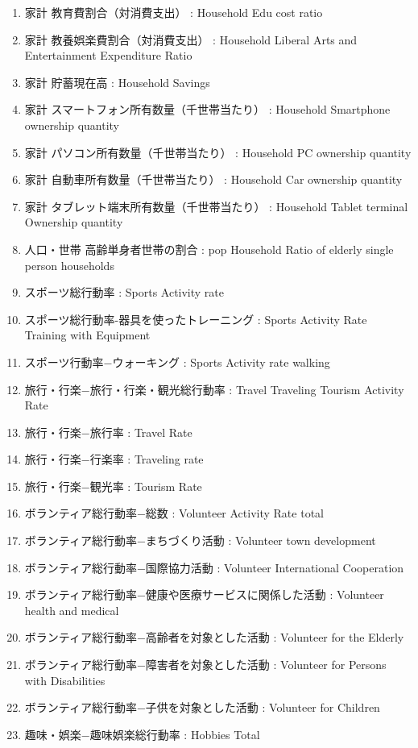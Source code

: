 \begin{multicols}{2}
\begin{enumerate}
  \item 家計 教育費割合（対消費支出）  :  Household Edu cost ratio
  \item 家計 教養娯楽費割合（対消費支出）  :  Household Liberal Arts and Entertainment Expenditure Ratio
  \item 家計 貯蓄現在高  :  Household Savings
  \item 家計 スマートフォン所有数量（千世帯当たり）  :  Household Smartphone ownership quantity
  \item 家計 パソコン所有数量（千世帯当たり）  :  Household PC ownership quantity
  \item 家計 自動車所有数量（千世帯当たり）  :  Household Car ownership quantity
  \item 家計 タブレット端末所有数量（千世帯当たり）  :  Household Tablet terminal Ownership quantity
  \item 人口・世帯 高齢単身者世帯の割合  :  pop Household Ratio of elderly single person households
  \item スポーツ総行動率  :  Sports Activity rate
  \item スポーツ総行動率-器具を使ったトレーニング  :  Sports Activity Rate Training with Equipment
  \item スポーツ行動率−ウォーキング  :  Sports Activity rate walking
  \item 旅行・行楽−旅行・行楽・観光総行動率  :  Travel Traveling Tourism Activity Rate
  \item 旅行・行楽−旅行率  :  Travel Rate
  \item 旅行・行楽−行楽率  :  Traveling rate
  \item 旅行・行楽−観光率  :  Tourism Rate
  \item ボランティア総行動率−総数  :  Volunteer Activity Rate total
  \item ボランティア総行動率−まちづくり活動  :  Volunteer town development
  \item ボランティア総行動率−国際協力活動  :  Volunteer International Cooperation
  \item ボランティア総行動率−健康や医療サービスに関係した活動  :  Volunteer health and medical
  \item ボランティア総行動率−高齢者を対象とした活動  :  Volunteer for the Elderly
  \item ボランティア総行動率−障害者を対象とした活動  :  Volunteer for Persons with Disabilities
  \item ボランティア総行動率−子供を対象とした活動  :  Volunteer for Children
  \item 趣味・娯楽−趣味娯楽総行動率  :  Hobbies Total

\end{enumerate}
\end{multicols}
